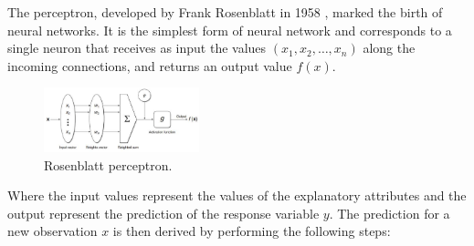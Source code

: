 The perceptron, developed by Frank Rosenblatt in 1958 \cite{rosenblatt1958perceptron}, marked the birth of neural networks. It is the simplest form of neural network and corresponds to a single neuron that receives as input the values $(x_1, x_2, \dots, x_n)$ along the incoming connections, and returns an output value $f(x)$.
\begin{figure}[H] 
    \centering
    \includegraphics[width=0.4\textwidth]{Machine_learning_thesis/Images/Rosenblatt perceptron.png}
    \caption{Rosenblatt perceptron.} 
    \label{fig:Rosenblatt perceptron} 
\end{figure}
Where the input values represent the values of the explanatory attributes and the output represent the prediction of the response variable $y$. The prediction for a new observation $x$ is then derived by performing the following steps:

